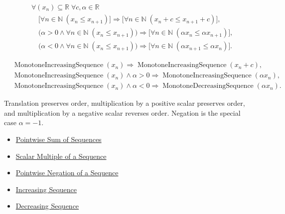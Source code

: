 \begin{remark*}
\[
\begin{aligned}
&\forall (x_n)\subseteq\mathbb{R}\;\forall c,\alpha\in\mathbb{R}\\
&\quad
\bigl[\forall n\in\mathbb{N}\;(x_n\le x_{n+1})\bigr]
\Longrightarrow
\bigl[\forall n\in\mathbb{N}\;(x_n+c\le x_{n+1}+c)\bigr],\\
&\quad
\bigl(\alpha>0\land\forall n\in\mathbb{N}\;(x_n\le x_{n+1})\bigr)
\Longrightarrow
\bigl[\forall n\in\mathbb{N}\;(\alpha x_n\le \alpha x_{n+1})\bigr],\\
&\quad
\bigl(\alpha<0\land\forall n\in\mathbb{N}\;(x_n\le x_{n+1})\bigr)
\Longrightarrow
\bigl[\forall n\in\mathbb{N}\;(\alpha x_{n+1}\le \alpha x_n)\bigr].
\end{aligned}
\]
\end{remark*}

\begin{remark*}
\[
\begin{aligned}
&\operatorname{MonotoneIncreasingSequence}(x_n)
\Longrightarrow
\operatorname{MonotoneIncreasingSequence}(x_n+c),\\
&\operatorname{MonotoneIncreasingSequence}(x_n)\land\alpha>0
\Longrightarrow
\operatorname{MonotoneIncreasingSequence}(\alpha x_n),\\
&\operatorname{MonotoneIncreasingSequence}(x_n)\land\alpha<0
\Longrightarrow
\operatorname{MonotoneDecreasingSequence}(\alpha x_n).
\end{aligned}
\]
\end{remark*}

\begin{remark*}[Interpretation]
Translation preserves order, multiplication by a positive scalar preserves
order, and multiplication by a negative scalar reverses order. Negation is the
special case $\alpha=-1$.
\end{remark*}

\begin{dependencies}
\begin{itemize}
  \item \hyperref[def:pointwise-sum-sequence]{Pointwise Sum of Sequences}
  \item \hyperref[def:scalar-multiple-sequence]{Scalar Multiple of a Sequence}
  \item \hyperref[def:pointwise-negation-sequence]{Pointwise Negation of a Sequence}
  \item \hyperref[def:increasing-sequence]{Increasing Sequence}
  \item \hyperref[def:decreasing-sequence]{Decreasing Sequence}
\end{itemize}
\end{dependencies}
